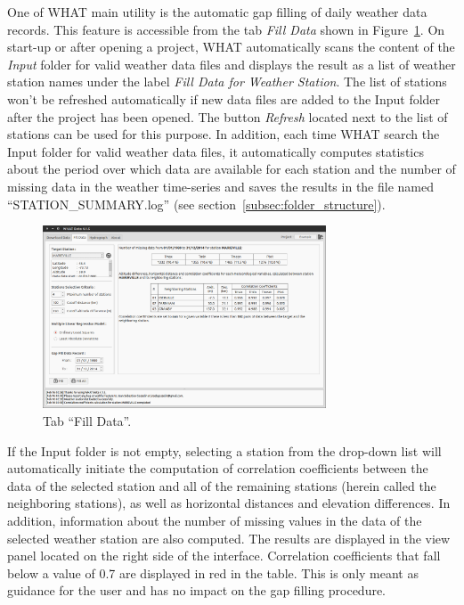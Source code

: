 \documentclass[WHATMANUAL.tex]{subfiles}
\begin{document}
One of WHAT main utility is the automatic gap filling of daily weather data records. This feature is accessible from the tab \emph{Fill Data} shown in Figure~\ref{fig:tab_fillData}. On start-up or after opening a project, WHAT automatically scans the content of the \emph{Input} folder for valid weather data files and displays the result as a list of weather station names under the label \emph{Fill Data for Weather Station}. The list of stations won't be refreshed automatically if new data files are added to the Input folder after the project has been opened. The button \emph{Refresh} located next to the list of stations can be used for this purpose. In addition, each time WHAT search the Input folder for valid weather data files, it automatically computes statistics about the period over which data are available for each station and the number of missing data in the weather time-series and saves the results in the file named ``STATION\_SUMMARY.log'' (see section~\ref{subsec:folder_structure}).

\begin{figure}[h!]
\centering
\includegraphics[width=0.75\textwidth]{img/WHAT_Screenshot001}
\caption[Tab ``Fill Data''.]{Tab ``Fill Data''.}
\label{fig:tab_fillData}
\end{figure}

If the Input folder is not empty, selecting a station from the drop-down list will automatically initiate the computation of correlation coefficients between the data of the selected station and all of the remaining stations (herein called the neighboring stations), as well as horizontal distances and elevation differences. In addition, information about the number of missing values in the data of the selected weather station are also computed. The results are displayed in the view panel located on the right side of the interface. Correlation coefficients that fall below a value of 0.7 are displayed in red in the table. This is only meant as guidance for the user and has no impact on the gap filling procedure.
\end{document}
